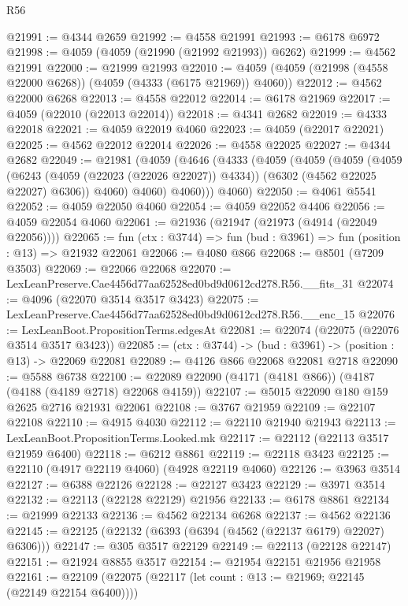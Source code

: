 \begin{lexlean}{R56}
\begin{coremodule}
@21991 := @4344 @2659
@21992 := @4558 @21991
@21993 := @6178 @6972
@21998 := @4059 (@4059 (@21990 (@21992 @21993)) @6262)
@21999 := @4562 @21991
@22000 := @21999 @21993
@22010 := @4059 (@4059 (@21998 (@4558 @22000 @6268)) (@4059 (@4333 (@6175 @21969)) @4060))
@22012 := @4562 @22000 @6268
@22013 := @4558 @22012
@22014 := @6178 @21969
@22017 := @4059 (@22010 (@22013 @22014))
@22018 := @4341 @2682
@22019 := @4333 @22018
@22021 := @4059 @22019 @4060
@22023 := @4059 (@22017 @22021)
@22025 := @4562 @22012 @22014
@22026 := @4558 @22025
@22027 := @4344 @2682
@22049 := @21981
    (@4059
      (@4646
        (@4333
          (@4059
            (@4059
              (@4059
                (@4059
                  (@6243 (@4059 (@22023 (@22026 @22027)) @4334))
                  (@6302 (@4562 @22025 @22027) @6306))
                @4060)
              @4060)
            @4060)))
      @4060)
@22050 := @4061 @5541
@22052 := @4059 @22050 @4060
@22054 := @4059 @22052 @4406
@22056 := @4059 @22054 @4060
@22061 := @21936 (@21947 (@21973 (@4914 (@22049 @22056))))
@22065 := fun (ctx : @3744) => fun (bud : @3961) => fun (position : @13) => @21932 @22061
@22066 := @4080 @866
@22068 := @8501 (@7209 @3503)
@22069 := @22066 @22068
@22070 := LexLeanPreserve.Cae4456d77aa62528ed0bd9d0612cd278.R56.__fits_31
@22074 := @4096 (@22070 @3514 @3517 @3423)
@22075 := LexLeanPreserve.Cae4456d77aa62528ed0bd9d0612cd278.R56.__enc_15
@22076 := LexLeanBoot.PropositionTerms.edgesAt
@22081 := @22074 (@22075 (@22076 @3514 @3517 @3423))
@22085 := (ctx : @3744) -> (bud : @3961) -> (position : @13) -> @22069 @22081
@22089 := @4126 @866 @22068 @22081 @2718
@22090 := @5588 @6738
@22100 := @22089 @22090 (@4171 (@4181 @866)) (@4187 (@4188 (@4189 @2718) @22068 @4159))
@22107 := @5015 @22090 @180 @159 @2625 @2716 @21931 @22061
@22108 := @3767 @21959
@22109 := @22107 @22108
@22110 := @4915 @4030
@22112 := @22110 @21940 @21943
@22113 := LexLeanBoot.PropositionTerms.Looked.mk
@22117 := @22112 (@22113 @3517 @21959 @6400)
@22118 := @6212 @8861
@22119 := @22118 @3423
@22125 := @22110 (@4917 @22119 @4060) (@4928 @22119 @4060)
@22126 := @3963 @3514
@22127 := @6388 @22126
@22128 := @22127 @3423
@22129 := @3971 @3514
@22132 := @22113 (@22128 @22129) @21956
@22133 := @6178 @8861
@22134 := @21999 @22133
@22136 := @4562 @22134 @6268
@22137 := @4562 @22136
@22145 := @22125 (@22132 (@6393 (@6394 (@4562 (@22137 @6179) @22027) @6306)))
@22147 := @305 @3517 @22129
@22149 := @22113 (@22128 @22147)
@22151 := @21924 @8855 @3517
@22154 := @21954 @22151 @21956 @21958
@22161 := @22109 (@22075 (@22117 (let count : @13 := @21969; @22145 (@22149 @22154 @6400))))

\end{coremodule}
\end{lexlean}
